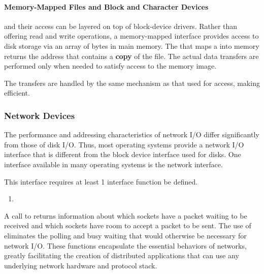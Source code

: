 \paragraph{Memory-Mapped Files and Block and Character Devices}\label{par:Memory_Mapped_Files_Block_Char_Devices}
 and their access can be layered on top of block-device drivers.
Rather than offering read and write operations, a memory-mapped interface provides access to disk storage via an array of bytes in main memory.
The  that maps a  into memory returns the  address that contains a \textbf{copy} of the file.
The actual data transfers are performed only when needed to satisfy access to the memory image.

The transfers are handled by the same mechanism as that used for   access, making  efficient.

\subsubsection{Network Devices}\label{subsubsec:Network_Devices}
The performance and addressing characteristics of network I/O differ significantly from those of disk I/O.
Thus, most operating systems provide a network I/O interface that is different from the block device interface used for disks.
One interface available in many operating systems is the network  interface.


This interface requires at least 1 interface function be defined.
\begin{enumerate}[noitemsep]
\item {}
\end{enumerate}

A call to  returns information about which sockets have a packet waiting to be received and which sockets have room to accept a packet to be sent.
The use of  eliminates the polling and busy waiting that would otherwise be necessary for network I/O.
These functions encapsulate the essential behaviors of networks, greatly facilitating the creation of distributed applications that can use any underlying network hardware and protocol stack.

